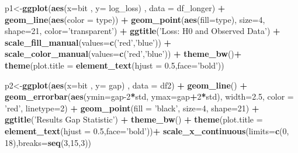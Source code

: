 \documentclass[]{article}
\newenvironment{Shaded}{\begin{snugshade}}{\end{snugshade}}
\newcommand{\DataTypeTok}[1]{\textcolor[rgb]{0.13,0.29,0.53}{#1}}
\newcommand{\DecValTok}[1]{\textcolor[rgb]{0.00,0.00,0.81}{#1}}
\newcommand{\FloatTok}[1]{\textcolor[rgb]{0.00,0.00,0.81}{#1}}
\newcommand{\KeywordTok}[1]{\textcolor[rgb]{0.13,0.29,0.53}{\textbf{#1}}}
\newcommand{\NormalTok}[1]{#1}
\newcommand{\OperatorTok}[1]{\textcolor[rgb]{0.81,0.36,0.00}{\textbf{#1}}}
\newcommand{\StringTok}[1]{\textcolor[rgb]{0.31,0.60,0.02}{#1}}
\begin{document}
\begin{Shaded}
\begin{Highlighting}[]
\NormalTok{p1<-}\KeywordTok{ggplot}\NormalTok{(}\KeywordTok{aes}\NormalTok{(}\DataTypeTok{x=}\NormalTok{bit  , }\DataTypeTok{y=}\NormalTok{ log_loss) , }\DataTypeTok{data =}\NormalTok{ df_longer) }\OperatorTok{+}
\StringTok{  }\KeywordTok{geom_line}\NormalTok{(}\KeywordTok{aes}\NormalTok{(}\DataTypeTok{color =}\NormalTok{ type)) }\OperatorTok{+}
\StringTok{  }\KeywordTok{geom_point}\NormalTok{(}\KeywordTok{aes}\NormalTok{(}\DataTypeTok{fill=}\NormalTok{type), }\DataTypeTok{size=}\DecValTok{4}\NormalTok{, }\DataTypeTok{shape=}\DecValTok{21}\NormalTok{, }\DataTypeTok{color=}\StringTok{'transparent'}\NormalTok{) }\OperatorTok{+}
\StringTok{  }\KeywordTok{ggtitle}\NormalTok{(}\StringTok{'Loss: H0 and Observed Data'}\NormalTok{) }\OperatorTok{+}
\StringTok{  }\KeywordTok{scale_fill_manual}\NormalTok{(}\DataTypeTok{values=}\KeywordTok{c}\NormalTok{(}\StringTok{'red'}\NormalTok{,}\StringTok{'blue'}\NormalTok{)) }\OperatorTok{+}\StringTok{ }
\StringTok{  }\KeywordTok{scale_color_manual}\NormalTok{(}\DataTypeTok{values=}\KeywordTok{c}\NormalTok{(}\StringTok{'red'}\NormalTok{,}\StringTok{'blue'}\NormalTok{)) }\OperatorTok{+}\StringTok{ }
\StringTok{  }\KeywordTok{theme_bw}\NormalTok{()}\OperatorTok{+}
\StringTok{  }\KeywordTok{theme}\NormalTok{(}\DataTypeTok{plot.title =} \KeywordTok{element_text}\NormalTok{(}\DataTypeTok{hjust =} \FloatTok{0.5}\NormalTok{,}\DataTypeTok{face=}\StringTok{'bold'}\NormalTok{))}

\NormalTok{p2<-}\KeywordTok{ggplot}\NormalTok{(}\KeywordTok{aes}\NormalTok{(}\DataTypeTok{x=}\NormalTok{bit  , }\DataTypeTok{y=}\NormalTok{ gap) , }\DataTypeTok{data =}\NormalTok{ df2) }\OperatorTok{+}
\StringTok{  }\KeywordTok{geom_line}\NormalTok{() }\OperatorTok{+}
\StringTok{  }\KeywordTok{geom_errorbar}\NormalTok{(}\KeywordTok{aes}\NormalTok{(}\DataTypeTok{ymin=}\NormalTok{gap}\DecValTok{-2}\OperatorTok{*}\NormalTok{std, }\DataTypeTok{ymax=}\NormalTok{gap}\OperatorTok{+}\DecValTok{2}\OperatorTok{*}\NormalTok{std), }\DataTypeTok{width=}\FloatTok{2.5}\NormalTok{, }\DataTypeTok{color =} \StringTok{'red'}\NormalTok{, }\DataTypeTok{linetype=}\DecValTok{2}\NormalTok{) }\OperatorTok{+}\StringTok{ }
\StringTok{  }\KeywordTok{geom_point}\NormalTok{(}\DataTypeTok{fill =} \StringTok{'black'}\NormalTok{, }\DataTypeTok{size=}\DecValTok{4}\NormalTok{, }\DataTypeTok{shape=}\DecValTok{21}\NormalTok{) }\OperatorTok{+}
\StringTok{  }\KeywordTok{ggtitle}\NormalTok{(}\StringTok{'Results Gap Statistic'}\NormalTok{) }\OperatorTok{+}
\StringTok{  }\KeywordTok{theme_bw}\NormalTok{() }\OperatorTok{+}
\StringTok{  }\KeywordTok{theme}\NormalTok{(}\DataTypeTok{plot.title =} \KeywordTok{element_text}\NormalTok{(}\DataTypeTok{hjust =} \FloatTok{0.5}\NormalTok{,}\DataTypeTok{face=}\StringTok{'bold'}\NormalTok{))}\OperatorTok{+}
\StringTok{  }\KeywordTok{scale_x_continuous}\NormalTok{(}\DataTypeTok{limits=}\KeywordTok{c}\NormalTok{(}\DecValTok{0}\NormalTok{, }\DecValTok{18}\NormalTok{),}\DataTypeTok{breaks=}\KeywordTok{seq}\NormalTok{(}\DecValTok{3}\NormalTok{,}\DecValTok{15}\NormalTok{,}\DecValTok{3}\NormalTok{))}


\end{Highlighting}
\end{Shaded}
\end{document}

